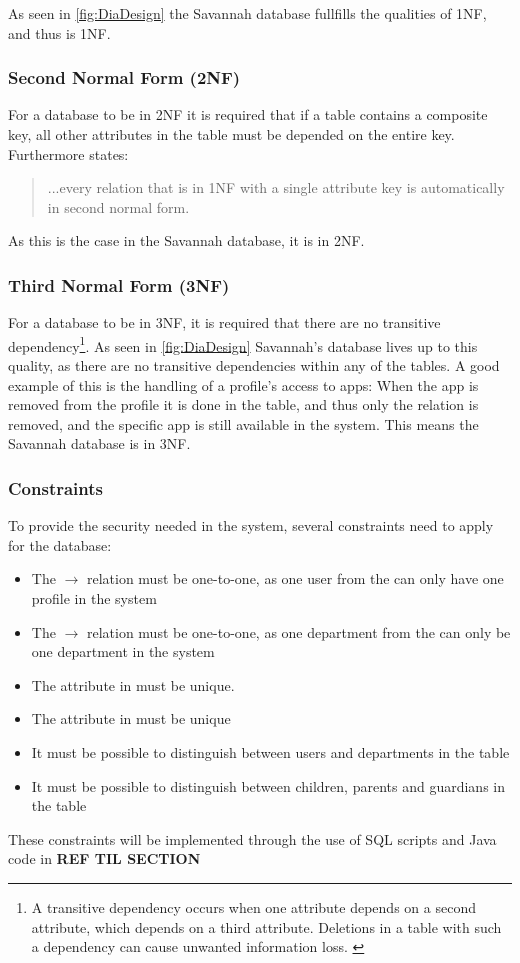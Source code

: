 As seen in \autoref{fig:DiaDesign} the Savannah database fullfills the qualities of 1NF, and thus is 1NF.

\subsubsection{Second Normal Form (2NF)}
For a database to be in 2NF it is required that if a table contains a composite key, all other attributes in the table must be depended on the entire key.
Furthermore \cite[p. 117]{sqlForDummies} states:
\begin{quotation}
...every
relation that is in 1NF with a single attribute key is automatically in second
normal form.
\end{quotation}
As this is the case in the Savannah database, it is in 2NF.

\subsubsection{Third Normal Form (3NF)}
For a database to be in 3NF, it is required that there are no transitive dependency\footnote{A transitive dependency occurs when one attribute depends on a second
attribute, which depends on a third attribute. Deletions in a table with such a
dependency can cause unwanted information loss. \cite[p. 118]{sqlForDummies}}.
As seen in \autoref{fig:DiaDesign} Savannah's database lives up to this quality, as there are no transitive dependencies within any of the tables. A good example of this is the handling of a profile's access to apps: When the app is removed from the profile it is done in the  table, and thus only the relation is removed, and the specific app is still available in the system. This means the Savannah database is in 3NF.



\subsubsection*{Constraints}
\label{databaseRules}
To provide the security needed in the system, several constraints need to apply for the database:
\begin{itemize}
	\item The $\rightarrow$ relation must be one-to-one, as one user from the  can only have one profile in the system
	\item The $\rightarrow$ relation must be one-to-one, as one department from the  can only be one department in the system
	\item The  attribute in  must be unique.
	\item The  attribute in  must be unique
	\item It must be possible to distinguish between users and departments in the  table
	\item It must be possible to distinguish between children, parents and guardians in the  table
\end{itemize}

These constraints will be implemented through the use of SQL scripts and Java code in \textbf{REF TIL SECTION} %